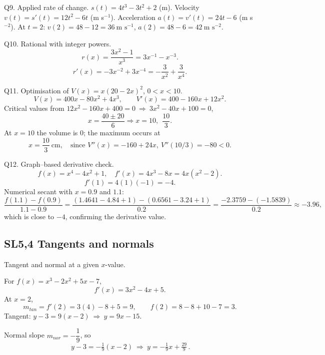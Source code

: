 \documentclass[11pt]{article}
\def\textbf#1{#1}%
\def\mathrm#1{#1}%
\newcommand{\tocsubsection}[1]{\subsection{#1}}
\begin{document}
\begin{solution}
\textbf{Q9. Applied rate of change.}
$s(t)=4t^{3}-3t^{2}+2$ (m).  
Velocity $v(t)=s'(t)=\boxed{12t^{2}-6t}$ (m s$^{-1}$).  
Acceleration $a(t)=v'(t)=\boxed{24t-6}$ (m s$^{-2}$).  
At $t=2$: $v(2)=48-12=\boxed{36\ \text{m s}^{-1}}$, $a(2)=48-6=\boxed{42\ \text{m s}^{-2}}$.
\end{solution}

\begin{solution}
\textbf{Q10. Rational with integer powers.}
\[
r(x)=\frac{3x^{2}-1}{x^{3}}=3x^{-1}-x^{-3}.
\]
\[
r'(x)=\boxed{-3x^{-2}+3x^{-4}}=-\frac{3}{x^{2}}+\frac{3}{x^{4}}.
\]
\end{solution}

\begin{solution}
\textbf{Q11. Optimisation of $V(x)=x(20-2x)^{2}$, $0<x<10$.}
\[
V(x)=400x-80x^{2}+4x^{3},\qquad V'(x)=400-160x+12x^{2}.
\]
Critical values from $12x^{2}-160x+400=0\ \Rightarrow\ 3x^{2}-40x+100=0$,
\[
x=\frac{40\pm20}{6}\Rightarrow x=10,\ \ \frac{10}{3}.
\]
At $x=10$ the volume is $0$; the maximum occurs at
\[
\boxed{x=\frac{10}{3}\ \text{cm}},\quad \text{since }V''(x)=-160+24x,\ V''(10/3)=-80<0.
\]
\end{solution}

\begin{solution}
\textbf{Q12. Graph–based derivative check.}
\[
f(x)=x^{4}-4x^{2}+1,\quad f'(x)=4x^{3}-8x=4x(x^{2}-2).
\]
\[
f'(1)=4(1)(-1)=\boxed{-4}.
\]
Numerical secant with $x=0.9$ and $1.1$:
\[
\frac{f(1.1)-f(0.9)}{1.1-0.9}
=\frac{(1.4641-4.84+1)-(0.6561-3.24+1)}{0.2}
=\frac{-2.3759-(-1.5839)}{0.2}\approx \boxed{-3.96},
\]
which is close to $-4$, confirming the derivative value.
\end{solution}





\tocsubsection{SL5,4 Tangents and normals}


\begin{solution}
\textbf{Tangent and normal at a given $x$-value.}

For $f(x)=x^3-2x^2+5x-7$,
\[
f'(x)=3x^2-4x+5.
\]
At $x=2$,
\[
m_{\mathrm{tan}}=f'(2)=3(4)-8+5=9,\qquad
f(2)=8-8+10-7=3.
\]
Tangent: $y-3=9(x-2)\ \Rightarrow\ \boxed{y=9x-15}$.

Normal slope $m_{\mathrm{nor}}=-\dfrac1{9}$, so
\[
\boxed{\,y-3=-\tfrac{1}{9}(x-2)\ \Rightarrow\ y=-\tfrac{1}{9}x+\tfrac{29}{9}\,}.
\]
\end{solution}
\end{document}
